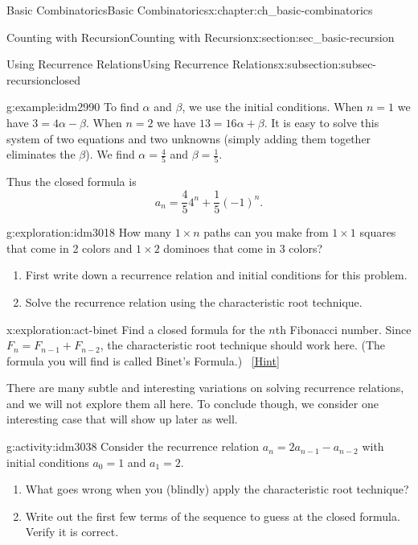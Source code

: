 \documentclass[oneside,10pt,]{book}
\numberwithin{equation}{chapter}
\begin{document}
\begin{chapterptx}{Basic Combinatorics}{}{Basic Combinatorics}{}{}{x:chapter:ch_basic-combinatorics}
\begin{sectionptx}{Counting with Recursion}{}{Counting with Recursion}{}{}{x:section:sec_basic-recursion}
\begin{subsectionptx}{Using Recurrence Relations}{}{Using Recurrence Relations}{}{}{x:subsection:subsec-recursionclosed}
\begin{example}{}{g:example:idm2990}
To find \(\alpha\) and \(\beta\), we use the initial conditions.   When \(n = 1\) we have \(3 = 4\alpha -\beta\).  When \(n = 2\) we have \(13 = 16\alpha + \beta\).  It is easy to solve this system of two equations and two unknowns (simply adding them together eliminates the \(\beta\)).  We find \(\alpha = \frac{4}{5}\) and \(\beta = \frac{1}{5}\).%
\par
Thus the closed formula is%
\begin{equation*}
a_n = \frac{4}{5} 4^n + \frac{1}{5} (-1)^n\text{.}
\end{equation*}
%
\end{example}
\begin{exploration}{}{g:exploration:idm3018}%
How many \(1\times n\) paths can you make from \(1\times 1\) squares that come in 2 colors and \(1\times 2\) dominoes that come in 3 colors?%
\begin{enumerate}[font=\bfseries,label=(\alph*),ref=\alph*]
\item{}First write down a recurrence relation and initial conditions for this problem.%
\item{}Solve the recurrence relation using the characteristic root technique.%
\end{enumerate}
\end{exploration}
\begin{exploration}{}{x:exploration:act-binet}%
Find a closed formula for the \(n\)th Fibonacci number.  Since \(F_n = F_{n-1} + F_{n-2}\), the characteristic root technique should work here.  (The formula you will find is called Binet's Formula.)%
\qquad~\hfill{\tiny\hyperlink{g:hint:idm3033-back}{[Hint]}}\end{exploration}
There are many subtle and interesting variations on solving recurrence relations, and we will not explore them all here.  To conclude though, we consider one interesting case that will show up later as well.%
\begin{activity}{}{g:activity:idm3038}%
Consider the recurrence relation \(a_n = 2a_{n-1} - a_{n-2}\) with initial conditions \(a_0 = 1\) and \(a_1 = 2\).%
\begin{enumerate}[font=\bfseries,label=(\alph*),ref=\alph*]
\item{}What goes wrong when you (blindly) apply the characteristic root technique?%
\item{}Write out the first few terms of the sequence to guess at the closed formula.  Verify it is correct.%
\end{enumerate}
\end{activity}

\end{subsectionptx}
\end{sectionptx}
\end{chapterptx}
\end{document}
